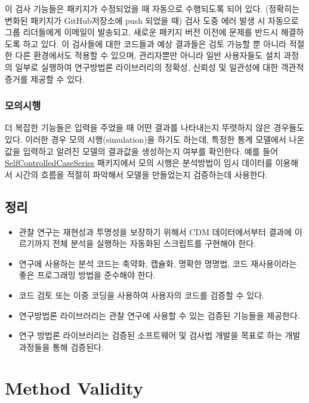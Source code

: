 \documentclass[11pt]{book}
\theoremstyle{definition}
\theoremstyle{definition}
\theoremstyle{definition}
\theoremstyle{remark}
\let\BeginKnitrBlock\begin \let\EndKnitrBlock\end
\begin{document}
이 검사 기능들은 패키지가 수정되었을 때 자동으로 수행되도록 되어 있다.
(정확히는 변화된 패키지가 GitHub저장소에 push 되었을 때) 검사 도중 에러
발생 시 자동으로 그룹 리더들에게 이메일이 발송되고, 새로운 패키지 버전
이전에 문제를 반드시 해결하도록 하고 있다. 이 검사들에 대한 코드들과
예상 결과들은 검토 가능할 뿐 아니라 적절한 다른 환경에서도 적용할 수
있으며, 관리자뿐만 아니라 일반 사용자들도 설치 과정의 일부로 실행하여
연구방법론 라이브러리의 정확성, 신뢰성 및 일관성에 대한 객관적 증거를
제공할 수 있다.

\subsection{모의시행}

더 복잡한 기능들은 입력을 주었을 때 어떤 결과를 나타내는지 뚜렷하지 않은
경우들도 있다. 이러한 경우 모의 시행(simulation)을 하기도 하는데, 특정한
통계 모델에서 나온 값을 입력하고 알려진 모델의 결과값을 생성하는지
여부를 확인한다. 예를 들어
\href{https://ohdsi.github.io/SelfControlledCaseSeries/}{SelfControlledCaseSeries}
패키지에서 모의 시행은 분석방법이 임시 데이터를 이용해서 시간의 흐름을
적절히 파악해서 모델을 만들었는지 검증하는데 사용한다.

\section{정리}

\BeginKnitrBlock{rmdsummary}
\begin{itemize}
\item
  관찰 연구는 재현성과 투명성을 보장하기 위해서 CDM 데이터에서부터
  결과에 이르기까지 전체 분석을 실행하는 자동화된 스크립트를 구현해야
  한다.
\item
  연구에 사용하는 분석 코드는 축약화, 캡슐화, 명확한 명명법, 코드
  재사용이라는 좋은 프로그래밍 방법을 준수해야 한다.
\item
  코드 검토 또는 이중 코딩을 사용하여 사용자의 코드를 검증할 수 있다.
\item
  연구방법론 라이브러리는 관찰 연구에 사용할 수 있는 검증된 기능들을
  제공한다.
\item
  연구 방법론 라이브러리는 검증된 소프트웨어 및 검사법 개발을 목표로
  하는 개발 과정들을 통해 검증된다.
\end{itemize}
\EndKnitrBlock{rmdsummary}

\chapter{Method Validity}\label{MethodValidity}
\end{document}
